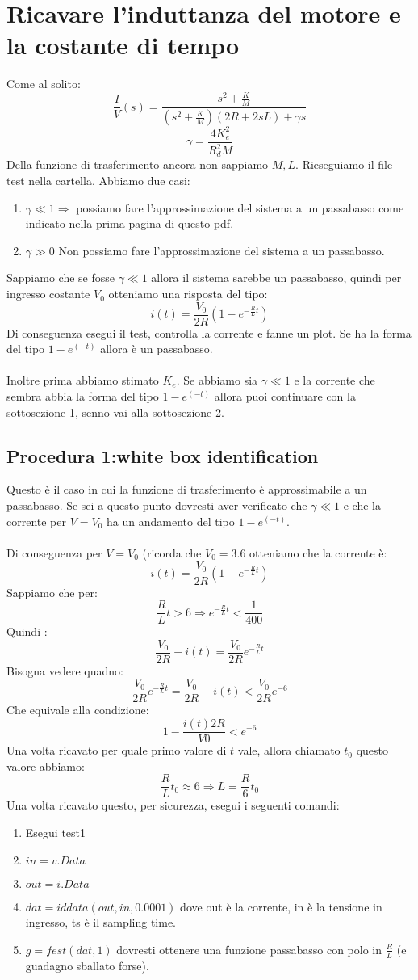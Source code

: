 \documentclass[10pt,a4paper]{article}
\begin{document}
\section{Ricavare l'induttanza del motore e la costante di tempo}
Come al solito:
$$\frac{I}{V}(s) = \frac{s^2+\frac{K}{M}}{(s^2+\frac{K}{M})(2R+2sL)+\gamma s}$$
$$\gamma = \frac{4K_e^2}{R_d^2M}$$
Della funzione di trasferimento ancora non sappiamo $M,L$. Rieseguiamo il file test nella cartella. Abbiamo due casi:
\begin{enumerate}
\item $\gamma \ll 1 \Rightarrow$ possiamo fare l'approssimazione del sistema a un passabasso come indicato nella prima pagina di questo pdf.
\item $\gamma \gg 0$ Non possiamo fare l'approssimazione del sistema a un passabasso.
\end{enumerate}
Sappiamo che se fosse $\gamma \ll 1$ allora il sistema sarebbe un passabasso, quindi per ingresso costante $V_0$ otteniamo una risposta del tipo:
$$i(t) = \frac{V_0}{2R}(1-e^{-\frac{R}{L}t})$$
Di conseguenza esegui il test, controlla la corrente e fanne un plot. Se ha la forma del tipo $1-e^(-t)$ allora è un passabasso. \\ \\

Inoltre prima abbiamo stimato $K_e$. Se abbiamo sia $\gamma \ll 1 $ e la corrente che sembra abbia la forma del tipo $1-e^(-t)$ allora puoi continuare con la sottosezione 1, senno vai alla sottosezione 2.
\subsection{Procedura 1:white box identification}
Questo è il caso in cui la funzione di trasferimento è approssimabile a un passabasso. Se sei a questo punto dovresti aver verificato che $\gamma \ll 1$ e che la corrente per $V=V_0$ ha un andamento del tipo $1-e^(-t)$. \\  \\
Di conseguenza per $V=V_0$ (ricorda che $V_0=3.6$ otteniamo che la corrente è:
$$i(t) = \frac{V_0}{2R}(1-e^{-\frac{R}{L}t})$$
Sappiamo che per:
$$\frac{R}{L}t > 6 \Rightarrow e^{-\frac{R}{L}t} < \frac{1}{400}$$
Quindi :
$$\frac{V_0}{2R} - i(t) = \frac{V_0}{2R}e^{-\frac{R}{L}t}$$
Bisogna vedere quadno:
$$\frac{V_0}{2R}e^{-\frac{R}{L}t}= \frac{V_0}{2R} - i(t) < \frac{V_0}{2R}e^{-6}$$
Che equivale alla condizione:
$$1- \frac{i(t)2R}{V0} < e^{-6}$$
Una volta ricavato per quale primo valore di $t$ vale, allora chiamato $t_0$ questo valore abbiamo:
$$\frac{R}{L}t_0 \approx 6 \Rightarrow L = \frac{R}{6}t_0$$
Una volta ricavato questo, per sicurezza, esegui i seguenti comandi:
\begin{enumerate}
\item Esegui test1
\item $in=v.Data$
\item $out = i.Data$
\item $dat = iddata(out,in, 0.0001)$ dove out è la corrente, in è la tensione in ingresso, ts è il sampling time.
\item $g = fest(dat, 1)$ dovresti ottenere una funzione passabasso con polo in $\frac{R}{L}$ (e guadagno sballato forse).
\end{enumerate}
\end{document}
